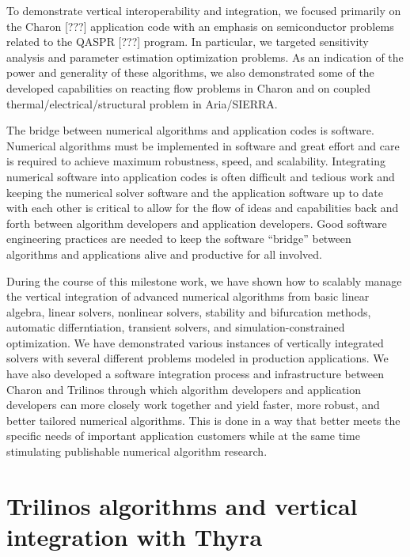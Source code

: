 \documentclass[pdf,ps2pdf,11pt]{SANDreport}
\begin{document}
To demonstrate vertical interoperability and integration, we focused primarily on
the Charon [???] application code with an emphasis on semiconductor problems
related to the QASPR [???] program.  In particular, we targeted sensitivity
analysis and parameter estimation optimization problems.  As an indication of
the power and generality of these algorithms, we also demonstrated some of the
developed capabilities on reacting flow problems in Charon and on coupled
thermal/electrical/structural problem in Aria/SIERRA.


The bridge between numerical algorithms and application codes is software.
Numerical algorithms must be implemented in software and great effort and care
is required to achieve maximum robustness, speed, and scalability.
Integrating numerical software into application codes is often difficult and
tedious work and keeping the numerical solver software and the application
software up to date with each other is critical to allow for the flow of ideas and
capabilities back and forth between algorithm developers and application
developers.  Good software engineering practices are needed to keep the
software ``bridge'' between algorithms and applications alive and productive
for all involved.

During the course of this milestone work, we have shown how to scalably manage
the vertical integration of advanced numerical algorithms from basic linear
algebra, linear solvers, nonlinear solvers, stability and bifurcation methods,
automatic differntiation, transient solvers, and simulation-constrained
optimization.  We have demonstrated various instances of vertically integrated
solvers with several different problems modeled in production applications.
We have also developed a software integration process and infrastructure
between Charon and Trilinos through which algorithm developers and application
developers can more closely work together and yield faster, more robust, and
better tailored numerical algorithms.  This is done in a way that better meets
the specific needs of important
application customers while at the same time stimulating publishable numerical
algorithm research.

%
\section{Trilinos algorithms and vertical integration with Thyra}
%
\end{document}
